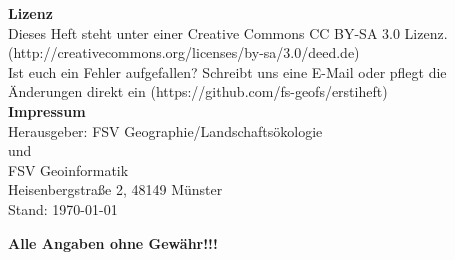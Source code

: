 \begin{center}
\begin{small}
 \textbf{Lizenz} \\ \medskip
Dieses Heft steht unter einer Creative Commons CC BY-SA 3.0 Lizenz. (http://creativecommons.org/licenses/by-sa/3.0/deed.de)\\ \smallskip
Ist euch ein Fehler aufgefallen? Schreibt uns eine E-Mail oder pflegt die Änderungen direkt ein (https://github.com/fs-geofs/erstiheft)\\ \bigskip
 \textbf{Impressum} \\ \medskip
Herausgeber: FSV Geographie/Landschaftsökologie\\
und\\
FSV Geoinformatik\\
Heisenbergstraße 2, 48149 Münster\\ \medskip
Stand: \today\mbox{ }\currenttime\\ \medskip
\end{small}
\begin{tiny}
\sffamily
\textbf{Alle Angaben ohne Gewähr!!!}
\end{tiny}
\end{center}
